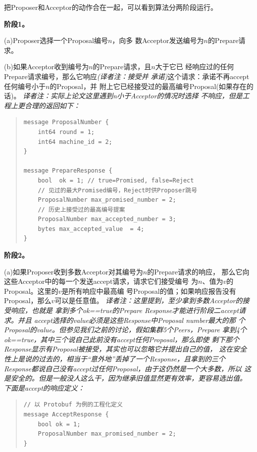 把Proposer和Acceptor的动作合在一起，可以看到算法分两阶段运行。

\textbf{阶段1。}

(a)Proposer选择一个Proposal编号\(n\)，向多
数Acceptor发送编号为\(n\)的Prepare请求。

(b)如果Acceptor收到编号为\(n\)的Prepare请求，且\(n\)大于它已
经响应过的任何Prepare请求编号，那么它响应\emph{(译者注：接受并
承诺)}这个请求：承诺不再accept任何编号小于\(n\)的Proposal，并
附上它已经接受过的最高编号Proposal(如果存在的话)。
\emph{译者注：实际上论文这里遇到n小于Acceptor的情况时选择
不响应，但是工程上更合理的返回如下：}

\begin{quote}
{\footnotesize
\begin{verbatim}
message ProposalNumber {
    int64 round = 1;
    int64 machine_id = 2;
}

message PrepareResponse {
    bool  ok = 1; // true=Promised, false=Reject
    // 见过的最大Promised编号，Reject时供Proposer跳号
    ProposalNumber max_promised_number = 2;
    // 历史上接受过的最高编号提案
    ProposalNumber max_accepted_number = 3;
    bytes max_accepted_value  = 4;
}
\end{verbatim}
}
\end{quote}

\textbf{阶段2。}

(a)如果Proposer收到多数Acceptor对其编号为\(n\)的Prepare请求的响应，
那么它向这些Acceptor中的每一个发送accept请求，请求它们接受编号
为\(n\)、值为\(v\)的Proposal。这里的\(v\)是所有响应中最高编
号Proposal的值；如果响应报告没有Proposal，那么\(v\)可以是任意值。
\emph{译者注：这里提到，至少拿到多数Acceptor的接受响应，也就是
拿到多个ok==true的Prepare Response才能进行阶段二accept请求。并且
accept选择的value必须是这些Response中Proposal number最大的那
个Proposal的value。但参见我们之前的讨论，假如集群5个Peers，Prepare
拿到4个ok==true，其中三个说自己此前没有accept任何Proposal，那么即使
剩下那个Response显示有Proposal被接受，其实也可以忽略它并提出自己的值，
这在安全性上是说的过去的，相当于“意外地”丢掉了一个Response，且拿到的三个
Response都说自己没有accept过任何Proposal，由于这仍然是一个大多数，所以
这是安全的。但是一般没人这么干，因为继承旧值显然更有效率，更容易选出值。
下面是accept的响应定义：}

\begin{quote}
{\footnotesize
\begin{verbatim}
// 以 Protobuf 为例的工程化定义
message AcceptResponse {
    bool ok = 1;
    ProposalNumber max_promised_number = 2;
}
\end{verbatim}
}
\end{quote}

